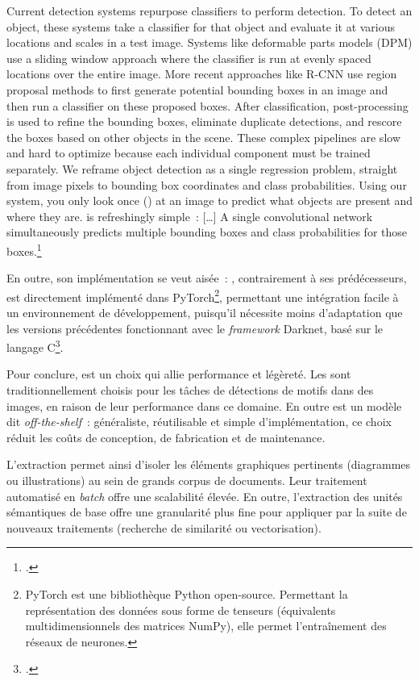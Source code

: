 \begin{kwote}                 
Current detection systems repurpose classifiers to perform detection. To
detect an object, these systems take a classifier for that object and
evaluate it at various locations and scales in a test image. Systems
like deformable parts models (DPM) use a sliding window approach where
the classifier is run at evenly spaced locations over the entire image.
More recent approaches like R-CNN use region proposal methods to first
generate potential bounding boxes in an image and then run a classifier
on these proposed boxes. After classification, post-processing is used
to refine the bounding boxes, eliminate duplicate detections, and
rescore the boxes based on other objects in the scene. These complex
pipelines are slow and hard to optimize because each individual
component must be trained separately. We reframe object detection as a
single regression problem, straight from image pixels to bounding box
coordinates and class probabilities. Using our system, you only look
once (\yolo) at an image to predict what objects are present and where
they are. \yolo is refreshingly simple~: {[}\ldots{]} A single
convolutional network simultaneously predicts multiple bounding boxes
and class probabilities for those boxes.\footcite[p.1]{redmon_you_2016}
                       \end{kwote}

En outre, son implémentation se veut aisée~: \yolov, contrairement à ses
prédécesseurs, est directement implémenté dans PyTorch\footnote{PyTorch est une
bibliothèque Python open-source. Permettant la représentation des
données sous forme de tenseurs (équivalents multidimensionnels des
matrices NumPy), elle permet l'entraînement des réseaux de neurones.},
permettant une intégration facile à un environnement de développement,
puisqu'il nécessite moins d'adaptation que les versions précédentes
fonctionnant avec le \textit{framework} Darknet, basé sur le langage
C\footcite[p.44]{norindr_traitement_2023}.

Pour conclure, \yolo est un choix qui allie performance et légèreté. Les
\cnns sont traditionnellement choisis pour les tâches de détections de
motifs dans des images, en raison de leur performance dans ce domaine.
En outre \yolo est un modèle dit \emph{off-the-shelf}~: généraliste,
réutilisable et simple d'implémentation, ce choix réduit les coûts de
conception, de fabrication et de maintenance.

L'extraction permet ainsi d'isoler les éléments graphiques pertinents
(diagrammes ou illustrations) au sein de grands corpus de documents.
Leur traitement automatisé en \textit{batch} offre une scalabilité élevée. En
outre, l'extraction des unités sémantiques de base offre une granularité
plus fine pour appliquer par la suite de nouveaux traitements (recherche
de similarité ou vectorisation).


